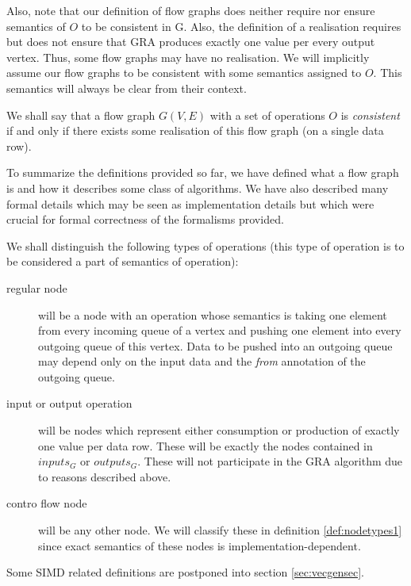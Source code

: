 Also, note that our definition of flow graphs does neither require nor ensure semantics of $O$ to be consistent in G. Also, the definition of a realisation requires but does not ensure that GRA produces exactly one value per every output vertex. Thus, some flow graphs may have no realisation. We will implicitly assume our flow graphs to be consistent with some semantics assigned to $O$. This semantics will always be clear from their context.


  We shall say that a flow graph $G(V,E)$ with a set of operations $O$ is \emph{consistent} if and only if there exists some realisation of this flow graph (on a single data row). 
\myenddef


To summarize the definitions provided so far, we have defined what a flow graph is and how it describes some class of algorithms. We have also described many formal details which may be seen as implementation details but which were crucial for formal correctness of the formalisms provided.

  We shall distinguish the following types of operations (this type of operation is to be considered a part of semantics of operation):
\begin{description}
  \item [regular node] will be a node with an operation whose semantics is taking one element from every incoming queue of a vertex and pushing one element into every outgoing queue of this vertex. Data to be pushed into an outgoing queue may depend only on the input data and the \emph{from} annotation of the outgoing queue.
\item [input or output operation] will be nodes which represent either consumption or production of exactly one value per data row.  These will be exactly the nodes contained in $inputs_G$ or $outputs_G$. These will not participate in the GRA algorithm due to reasons described above.
\item [contro flow node] will be any other node. We will classify these in definition \ref{def:nodetypes1} since exact semantics of these nodes is implementation-dependent. 
\end{description}
\myenddef

  Some SIMD related definitions are postponed into section \ref{sec:vecgensec}.


